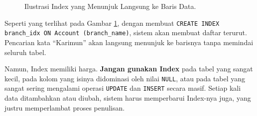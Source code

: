 \documentclass[11pt,a4paper]{article}
\begin{document}
\begin{figure}[H]
	\centering
	\caption{Ilustrasi Index yang Menunjuk Langsung ke Baris Data.}
	\label{fig:index}
\end{figure}

Seperti yang terlihat pada Gambar \ref{fig:index}, dengan membuat \texttt{CREATE INDEX branch\_idx ON Account (branch\_name)}, sistem akan membuat daftar terurut. Pencarian kata ``Karimun'' akan langsung menunjuk ke barisnya tanpa memindai seluruh tabel.

Namun, Index memiliki harga. \textbf{Jangan gunakan Index} pada tabel yang sangat kecil, pada kolom yang isinya didominasi oleh nilai \texttt{NULL}, atau pada tabel yang sangat sering mengalami operasi \texttt{UPDATE} dan \texttt{INSERT} secara masif. Setiap kali data ditambahkan atau diubah, sistem harus memperbarui Index-nya juga, yang justru memperlambat proses penulisan.
\end{document}
